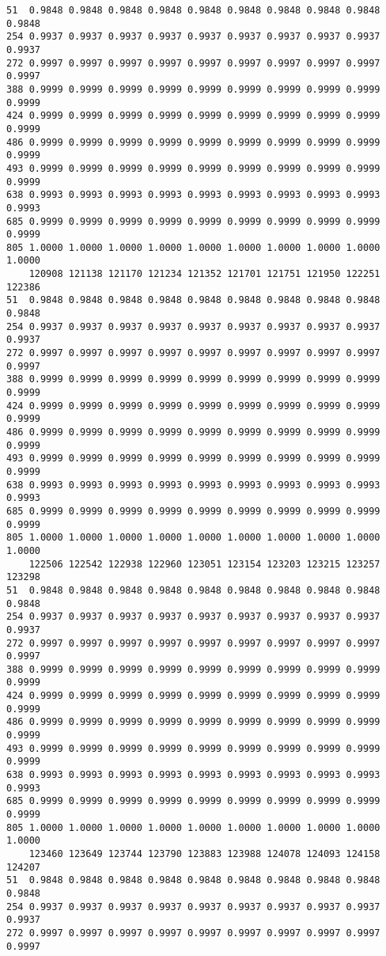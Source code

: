 \documentclass[
]{report}
\begin{document}
\begin{verbatim}
51  0.9848 0.9848 0.9848 0.9848 0.9848 0.9848 0.9848 0.9848 0.9848 0.9848
254 0.9937 0.9937 0.9937 0.9937 0.9937 0.9937 0.9937 0.9937 0.9937 0.9937
272 0.9997 0.9997 0.9997 0.9997 0.9997 0.9997 0.9997 0.9997 0.9997 0.9997
388 0.9999 0.9999 0.9999 0.9999 0.9999 0.9999 0.9999 0.9999 0.9999 0.9999
424 0.9999 0.9999 0.9999 0.9999 0.9999 0.9999 0.9999 0.9999 0.9999 0.9999
486 0.9999 0.9999 0.9999 0.9999 0.9999 0.9999 0.9999 0.9999 0.9999 0.9999
493 0.9999 0.9999 0.9999 0.9999 0.9999 0.9999 0.9999 0.9999 0.9999 0.9999
638 0.9993 0.9993 0.9993 0.9993 0.9993 0.9993 0.9993 0.9993 0.9993 0.9993
685 0.9999 0.9999 0.9999 0.9999 0.9999 0.9999 0.9999 0.9999 0.9999 0.9999
805 1.0000 1.0000 1.0000 1.0000 1.0000 1.0000 1.0000 1.0000 1.0000 1.0000
    120908 121138 121170 121234 121352 121701 121751 121950 122251 122386
51  0.9848 0.9848 0.9848 0.9848 0.9848 0.9848 0.9848 0.9848 0.9848 0.9848
254 0.9937 0.9937 0.9937 0.9937 0.9937 0.9937 0.9937 0.9937 0.9937 0.9937
272 0.9997 0.9997 0.9997 0.9997 0.9997 0.9997 0.9997 0.9997 0.9997 0.9997
388 0.9999 0.9999 0.9999 0.9999 0.9999 0.9999 0.9999 0.9999 0.9999 0.9999
424 0.9999 0.9999 0.9999 0.9999 0.9999 0.9999 0.9999 0.9999 0.9999 0.9999
486 0.9999 0.9999 0.9999 0.9999 0.9999 0.9999 0.9999 0.9999 0.9999 0.9999
493 0.9999 0.9999 0.9999 0.9999 0.9999 0.9999 0.9999 0.9999 0.9999 0.9999
638 0.9993 0.9993 0.9993 0.9993 0.9993 0.9993 0.9993 0.9993 0.9993 0.9993
685 0.9999 0.9999 0.9999 0.9999 0.9999 0.9999 0.9999 0.9999 0.9999 0.9999
805 1.0000 1.0000 1.0000 1.0000 1.0000 1.0000 1.0000 1.0000 1.0000 1.0000
    122506 122542 122938 122960 123051 123154 123203 123215 123257 123298
51  0.9848 0.9848 0.9848 0.9848 0.9848 0.9848 0.9848 0.9848 0.9848 0.9848
254 0.9937 0.9937 0.9937 0.9937 0.9937 0.9937 0.9937 0.9937 0.9937 0.9937
272 0.9997 0.9997 0.9997 0.9997 0.9997 0.9997 0.9997 0.9997 0.9997 0.9997
388 0.9999 0.9999 0.9999 0.9999 0.9999 0.9999 0.9999 0.9999 0.9999 0.9999
424 0.9999 0.9999 0.9999 0.9999 0.9999 0.9999 0.9999 0.9999 0.9999 0.9999
486 0.9999 0.9999 0.9999 0.9999 0.9999 0.9999 0.9999 0.9999 0.9999 0.9999
493 0.9999 0.9999 0.9999 0.9999 0.9999 0.9999 0.9999 0.9999 0.9999 0.9999
638 0.9993 0.9993 0.9993 0.9993 0.9993 0.9993 0.9993 0.9993 0.9993 0.9993
685 0.9999 0.9999 0.9999 0.9999 0.9999 0.9999 0.9999 0.9999 0.9999 0.9999
805 1.0000 1.0000 1.0000 1.0000 1.0000 1.0000 1.0000 1.0000 1.0000 1.0000
    123460 123649 123744 123790 123883 123988 124078 124093 124158 124207
51  0.9848 0.9848 0.9848 0.9848 0.9848 0.9848 0.9848 0.9848 0.9848 0.9848
254 0.9937 0.9937 0.9937 0.9937 0.9937 0.9937 0.9937 0.9937 0.9937 0.9937
272 0.9997 0.9997 0.9997 0.9997 0.9997 0.9997 0.9997 0.9997 0.9997 0.9997

\end{verbatim}
\end{document}
